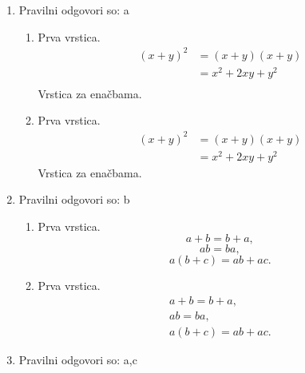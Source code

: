 \documentclass[11pt]{article}
\begin{document}
\begin{enumerate}
    \item Pravilni odgovori so: a %
    \begin{enumerate}
        \item Prva vrstica.
\begin{align*}
  (x + y)^2 &= (x + y)(x + y) \\
  &= x^2 + 2 x y + y^2 \\
\end{align*}
        Vrstica za enačbama.
        \item Prva vrstica.
\begin{align*}
  (x + y)^2 &= (x + y)(x + y) \\
  &= x^2 + 2 x y + y^2
\end{align*}
        Vrstica za enačbama.
    \end{enumerate}

    \item Pravilni odgovori so: b%
    \begin{enumerate}
        \item Prva vrstica.
\[ a + b = b + a, \]
\[ a b = b a, \]
\[ a (b + c) = a b + a c. \]
        \item Prva vrstica.
\begin{gather*}
  a + b = b + a, \\
  a b = b a, \\
  a (b + c) = a b + a c.
\end{gather*}
    \end{enumerate}

    \item Pravilni odgovori so: a,c %

\end{enumerate}
\end{document}
